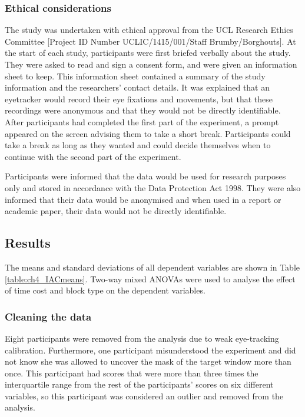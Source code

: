 \subsubsection{Ethical considerations}\label{sec:quanethics}
The study was undertaken with ethical approval from the UCL Research Ethics Committee [Project ID Number UCLIC/1415/001/Staff Brumby/Borghouts]. 
At the start of each study, participants were first briefed verbally about the study. They were asked to read and sign a consent form, and were given an information sheet to keep. This information sheet contained a summary of the study information and the researchers' contact details. It was explained that an eyetracker would record their eye fixations and movements, but that these recordings were anonymous and that they would not be directly identifiable. After participants had completed the first part of the experiment, a prompt appeared on the screen advising them to take a short break. Participants could take a break as long as they wanted and could decide themselves when to continue with the second part of the experiment.

Participants were informed that the data would be used for research purposes only and stored in accordance with the Data Protection Act 1998. They were also informed that their data would be anonymised and when used in a report or academic paper, their data would not be directly identifiable.

\subsection{Results}
The means and standard deviations of all dependent variables are shown in Table \ref{table:ch4_IACmeans}. Two-way mixed ANOVAs were used to analyse the effect of time cost and block type on the dependent variables. 

\subsubsection{Cleaning the data}
Eight participants were removed from the analysis due to weak eye-tracking calibration. Furthermore, one participant misunderstood the experiment and did not know she was allowed to uncover the mask of the target window more than once. This participant had scores that were more than three times the interquartile range from the rest of the participants' scores on six different variables, so this participant was considered an outlier and removed from the analysis. 

